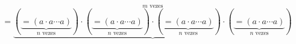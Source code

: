 \documentclass[preview]{standalone}
\begin{document}
\begin{align*}
=\underbrace{(\underbrace{=(a \cdot a \cdots a)}_{n \text{ vezes}})\cdot(\underbrace{=(a \cdot a \cdots a)}_{n \text{ vezes}})\cdot(\underbrace{=(a \cdot a \cdots a)}_{n \text{ vezes}})\cdot(\underbrace{=(a \cdot a \cdots a)}_{n \text{ vezes}})}^{m \text{ vezes}}
\end{align*}
\end{document}
